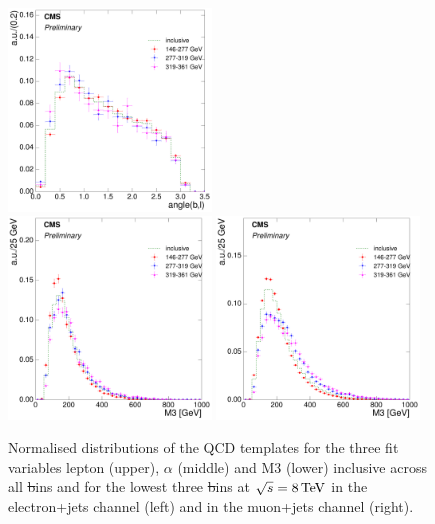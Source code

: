 \begin{figure}[hbtp]
     \includegraphics[width=0.48\textwidth]{Chapters/04_Analysis/04b_XSections/images/8TeV/fit_variables/muon/ST/angle_bl/qcd/ST_angle_bl_1orMoreBtag_QCD_template_comparison.pdf}\\
     \includegraphics[width=0.48\textwidth]{Chapters/04_Analysis/04b_XSections/images/8TeV/fit_variables/electron/ST/M3/qcd/ST_M3_0orMoreBtag_QCD_template_comparison.pdf}\hfill
     \includegraphics[width=0.48\textwidth]{Chapters/04_Analysis/04b_XSections/images/8TeV/fit_variables/muon/ST/M3/qcd/ST_M3_0orMoreBtag_QCD_template_comparison.pdf}\\
	 \caption[Normalised distributions of the QCD templates for the three fit variables in \st bins
	 at $\sqrt{s}=8\TeV$.]{Normalised distributions of the QCD templates for the three fit variables lepton
	 \abseta (upper), $\alpha$ (middle) and M3 (lower) inclusive across all \st bins and for the lowest three \st
	 bins at $\sqrt{s}=8\TeV$ in the electron+jets channel (left) and in the muon+jets channel (right).}
     \label{fig:ST_fit_variable_qcd_comparisons_8TeV}
\end{figure}

